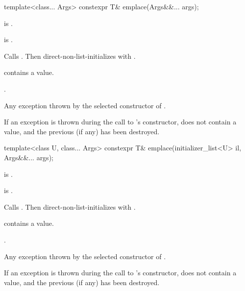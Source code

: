 %
\begin{itemdecl}
template<class... Args>
  constexpr T& emplace(Args&&... args);
\end{itemdecl}

\begin{itemdescr}
\begin{removedblock}
\pnum
\constraints
{} is .
\end{removedblock}

\begin{addedblock}
\pnum
\mandates
{} is .
\end{addedblock}

\pnum
\effects
Calls . Then direct-non-list-initializes  with .

\pnum
\ensures
{} contains a value.

\pnum
\returns
{}.

\pnum
\throws
Any exception thrown by the selected constructor of .

\pnum
\remarks
If an exception is thrown during the call to 's constructor,  does not contain a value, and the previous  (if any) has been destroyed.
\end{itemdescr}

%
\begin{itemdecl}
template<class U, class... Args>
  constexpr T& emplace(initializer_list<U> il, Args&&... args);
\end{itemdecl}

\begin{itemdescr}
\begin{removedblock}
\pnum
\constraints
{} is .
\end{removedblock}

\begin{addedblock}
\pnum
\mandates
{} is .
\end{addedblock}

\pnum
\effects
Calls . Then direct-non-list-initializes  with .

\pnum
\ensures
{} contains a value.

\pnum
\returns
{}.

\pnum
\throws
Any exception thrown by the selected constructor of .

\pnum
\remarks
If an exception is thrown during the call to 's constructor,  does not contain a value, and the previous  (if any) has been destroyed.
\end{itemdescr}


